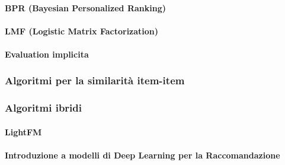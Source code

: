 \paragraph{BPR (Bayesian Personalized
Ranking)}\label{bpr-bayesian-personalized-ranking}

\paragraph{LMF (Logistic Matrix
Factorization)}\label{lmf-logistic-matrix-factorization}

\paragraph{Evaluation implicita}\label{evaluation-implicita}

\subsubsection{Algoritmi per la similarità
item-item}\label{algoritmi-per-la-similarituxe0-item-item}

\subsubsection{Algoritmi ibridi}\label{algoritmi-ibridi}

\paragraph{LightFM}\label{lightfm}

\paragraph{Introduzione a modelli di Deep Learning per la
Raccomandazione}\label{introduzione-a-modelli-di-deep-learning-per-la-raccomandazione}
